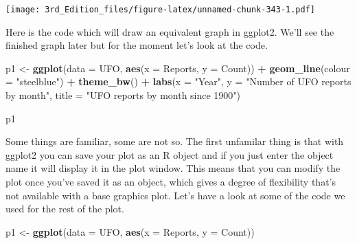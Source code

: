 \documentclass[
]{book}
\newenvironment{Shaded}{\begin{snugshade}}{\end{snugshade}}
\newcommand{\DataTypeTok}[1]{\textcolor[rgb]{0.13,0.29,0.53}{#1}}
\newcommand{\KeywordTok}[1]{\textcolor[rgb]{0.13,0.29,0.53}{\textbf{#1}}}
\newcommand{\NormalTok}[1]{#1}
\newcommand{\OperatorTok}[1]{\textcolor[rgb]{0.81,0.36,0.00}{\textbf{#1}}}
\newcommand{\StringTok}[1]{\textcolor[rgb]{0.31,0.60,0.02}{#1}}
\begin{document}
\texttt{[image: 3rd\_Edition\_files/figure-latex/unnamed-chunk-343-1.pdf]}

Here is the code which will draw an equivalent graph in ggplot2. We'll see the finished graph later but for the moment let's look at the code.

\begin{Shaded}
\begin{Highlighting}[]
\NormalTok{p1 <-}\StringTok{ }\KeywordTok{ggplot}\NormalTok{(}\DataTypeTok{data =}\NormalTok{ UFO, }\KeywordTok{aes}\NormalTok{(}\DataTypeTok{x =}\NormalTok{ Reports, }\DataTypeTok{y =}\NormalTok{ Count)) }\OperatorTok{+}
\StringTok{               }\KeywordTok{geom_line}\NormalTok{(}\DataTypeTok{colour =} \StringTok{"steelblue"}\NormalTok{) }\OperatorTok{+}
\StringTok{               }\KeywordTok{theme_bw}\NormalTok{() }\OperatorTok{+}
\StringTok{               }\KeywordTok{labs}\NormalTok{(}\DataTypeTok{x =} \StringTok{"Year"}\NormalTok{, }
                    \DataTypeTok{y =} \StringTok{"Number of UFO reports by month"}\NormalTok{, }
                    \DataTypeTok{title =} \StringTok{"UFO reports by month since 1900"}\NormalTok{)}

\NormalTok{p1}
\end{Highlighting}
\end{Shaded}

Some things are familiar, some are not so. The first unfamilar thing is that with ggplot2 you can save your plot as an R object and if you just enter the object name it will display it in the plot window. This means that you can modify the plot once you've saved it as an object, which gives a degree of flexibility that's not available with a base graphics plot. Let's have a look at some of the code we used for the rest of the plot.

\begin{Shaded}
\begin{Highlighting}[]
\NormalTok{p1 <-}\StringTok{ }\KeywordTok{ggplot}\NormalTok{(}\DataTypeTok{data =}\NormalTok{ UFO, }\KeywordTok{aes}\NormalTok{(}\DataTypeTok{x =}\NormalTok{ Reports, }
                             \DataTypeTok{y =}\NormalTok{ Count))}
\end{Highlighting}
\end{Shaded}
\end{document}
